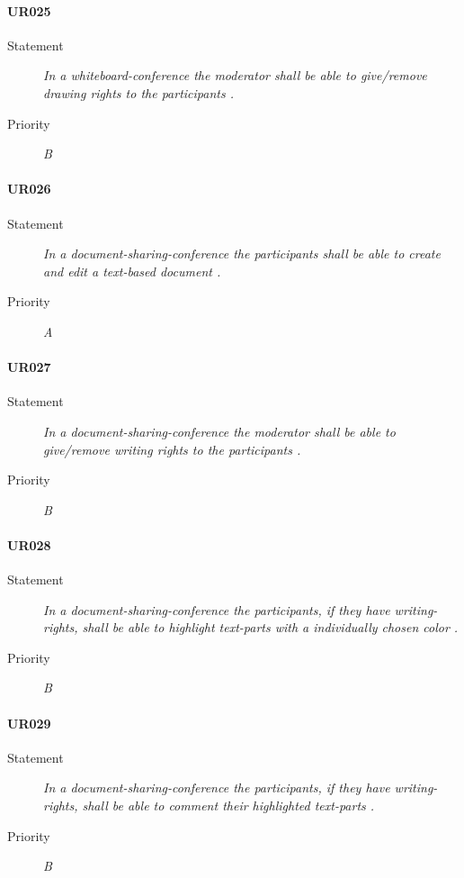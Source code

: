 \paragraph{UR025}
  \begin{description}
  \item [Statement] 
    \textit{ In a whiteboard-\gls{conference} the \gls{moderator} shall be able to give/remove drawing rights to the participants
    .}
  \item [Priority] \textit{B}
\end{description}
    
\paragraph{UR026}
  \begin{description}
  \item [Statement] 
    \textit{ In a document-sharing-\gls{conference} the participants shall be able to create and edit a text-based document
    .}
  \item [Priority] \textit{A}
\end{description}

\paragraph{UR027}
  \begin{description}
  \item [Statement] 
    \textit{ In a document-sharing-\gls{conference} the \gls{moderator} shall be able to give/remove writing rights to the participants
    .}
  \item [Priority] \textit{B}
\end{description}
    
\paragraph{UR028}
  \begin{description}
  \item [Statement] 
    \textit{ In a document-sharing-\gls{conference} the participants, if they have writing-rights, 
            shall be able to highlight text-parts with a individually chosen color
    .}
  \item [Priority] \textit{B}
\end{description}
    
\paragraph{UR029}
  \begin{description}
  \item [Statement] 
    \textit{ In a document-sharing-\gls{conference} the participants, if they have writing-rights, 
            shall be able to comment their highlighted text-parts
    .}
  \item [Priority] \textit{B}
\end{description}
    
